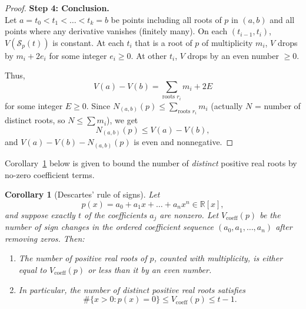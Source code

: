 \documentclass[11pt]{article}
\newtheorem{corollary}{Corollary}
\begin{document}
\begin{proof}
\noindent \textbf{Step 4: Conclusion.} \\
Let \(a = t_0 < t_1 < \dots < t_k = b\) be points including all roots of \(p\) in \((a,b)\) and all points where any derivative vanishes (finitely many). On each \((t_{i-1}, t_i)\), \(V(\mathcal{S}_p(t))\) is constant. At each \(t_i\) that is a root of \(p\) of multiplicity \(m_i\), \(V\) drops by \(m_i + 2e_i\) for some integer \(e_i \ge 0\). At other \(t_i\), \(V\) drops by an even number \(\ge 0\).

Thus,
\[
V(a) - V(b) = \sum_{\text{roots } r_i} m_i + 2E
\]
for some integer \(E \ge 0\). Since \(N_{(a,b)}(p) \le \sum_{\text{roots } r_i} m_i\) (actually \(N\) = number of distinct roots, so \(N \le \sum m_i\)), we get
\[
N_{(a,b)}(p) \le V(a) - V(b),
\]
and \(V(a) - V(b) - N_{(a,b)}(p)\) is even and nonnegative.
\end{proof}

Corollary~\ref{cor:descartes} below is given to bound the number of \emph{distinct} positive real roots by no-zero coefficient terms. 

\begin{corollary}[Descartes' rule of signs]
\label{cor:descartes}
Let
\[
p(x) = a_0 + a_1x + \dots + a_nx^n \in \mathbb{R}[x],
\]
and suppose exactly \( t \) of the coefficients \( a_j \) are nonzero. Let \( V_{\mathrm{coeff}}(p) \) be the number of sign changes in the ordered coefficient sequence \( (a_0, a_1, \dots, a_n) \) after removing zeros. Then:

\begin{enumerate}
    \item The number of positive real roots of \( p \), counted with multiplicity, is either equal to \( V_{\mathrm{coeff}}(p) \) or less than it by an even number.
    \item In particular, the number of distinct positive real roots satisfies
    \[
    \#\{x>0 : p(x)=0\} \le V_{\mathrm{coeff}}(p) \le t-1.
    \]
\end{enumerate}
\end{corollary}
\end{document}
